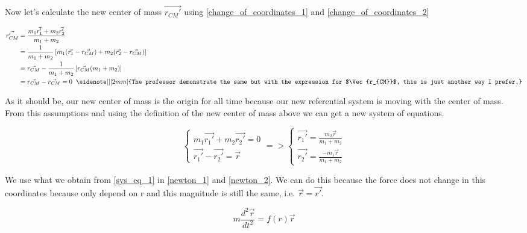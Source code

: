 Now let's calculate the new center of mass $\vec{r_{CM}'}$ using \ref{change_of_coordinates_1} and \ref{change_of_coordinates_2}

\begin{equation}
    \label{cm_prima}
    \begin{split}
    \vec{r_{CM}'} & = \frac{m_1\vec{r_1'}+ m_2\vec{r_2'}}{m_1+m_2} \\
                  & = \frac{1}{m_1 + m_2} \left[ m_1(\vec{r_1}-\vec{r_{CM}}) + m_2(\vec{r_2}-\vec{r_{CM}})\right] \\
                  & = \vec{r_{CM}} - \frac{1}{m_1+m_2}\left[\vec{r_{CM}}(m_1+ m_2)\right]\\
                  & = \vec{r_{CM}} - \vec{r_{CM}} = 0 \hspace{2mm} \sidenote[][2mm]{The professor demonstrate the same but with the expression for $\Vec{r_{CM}}$, this is just another way I prefer.}
    \end{split}
\end{equation}

As it should be, our new center of mass is the origin for all time because our new referential system is moving with the center of mass. From this assumptions and using the definition of the new center of mass above we can get a new system of equations.

\begin{equation}
\label{sys_eq_1}
    \left\{
    \begin{array}{l}
        m_1\vec{r_1'} + m_2\vec{r_2'} = 0 \\
        \vec{r_1'} - \vec{r_2'} = \vec{r}
    \end{array}
    \right. =>
    \left\{
    \begin{array}{l}
        \vec{r_1'} = \frac{m_2\vec{r}}{m_1+m_2} \\
        \vec{r_2'} = \frac{-m_1\vec{r}}{m_1+m_2}
    \end{array}
    \right.
\end{equation}

 We use what we obtain from \ref{sys_eq_1} in \ref{newton_1} and \ref{newton_2}. We can do this because the force does not change in this coordinates because only depend on r and this magnitude is still the same, i.e. $\vec{r}=\vec{r'}$.

\begin{equation}
\label{sys_eq_sol}
    m \frac{d^2\vec{r}}{dt^2} = f(r) \vec{r}
\end{equation}

